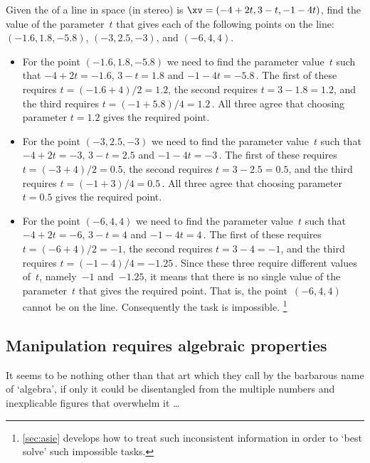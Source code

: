 \begin{example} \label{eg:}
Given the  of a line in space (in stereo) is \(\xv=(-4+2t,3-t,-1-4t)\), find the value of the parameter~\(t\) that gives each of the following points on the line: \((-1.6,1.8,-5.8)\), \((-3,2.5,-3)\), and \((-6,4,4)\).
\begin{solution} 
\begin{itemize}
\item For the point \((-1.6,1.8,-5.8)\) we need to find the parameter value~\(t\) such that \(-4+2t=-1.6\), \(3-t=1.8\) and \(-1-4t=-5.8\)\,.
The first of these requires \(t=(-1.6+4)/2=1.2\), the second requires \(t=3-1.8=1.2\), and the third requires \(t=(-1+5.8)/4=1.2\)\,.
All three agree that choosing parameter \(t=1.2\) gives the required point.

\item For the point \((-3,2.5,-3)\) we need to find the parameter value~\(t\) such that \(-4+2t=-3\), \(3-t=2.5\) and \(-1-4t=-3\)\,.
The first of these requires \(t=(-3+4)/2=0.5\), the second requires \(t=3-2.5=0.5\), and the third requires \(t=(-1+3)/4=0.5\)\,.
All three agree that choosing parameter \(t=0.5\) gives the required point.

\item For the point \((-6,4,4)\) we need to find the parameter value~\(t\) such that \(-4+2t=-6\), \(3-t=4\) and \(-1-4t=4\)\,.
The first of these requires \(t=(-6+4)/2=-1\), the second requires \(t=3-4=-1\), and the third requires \(t=(-1-4)/4=-1.25\)\,.
Since these three require different values of~\(t\), namely~\(-1\) and~\(-1.25\), it means that there is no single value of the parameter~\(t\) that gives the required point.
That is, the point~\((-6,4,4)\) cannot be on the line.
Consequently the task is impossible.
\footnote{\autoref{sec:asie} develops how to treat such inconsistent information in order to `best solve' such impossible tasks.}

\end{itemize}
\end{solution}
\end{example}






\subsection{Manipulation requires algebraic properties}
\label{sec:mrap}

\begin{quoted}{}
It seems to be nothing other than that art which they call by the barbarous name of `algebra', if only it could be disentangled from the multiple numbers and inexplicable figures that overwhelm it \ldots
\end{quoted}

